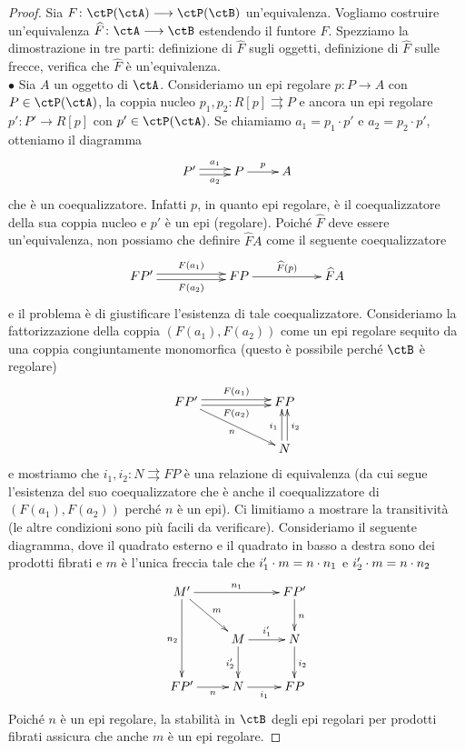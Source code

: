 \begin{proof}
 Sia \(F \colon \ctP(\ctA) \fun \ctP(\ctB)\) un'equivalenza. Vogliamo costruire un'equivalenza \(\widehat{F} \colon \ctA \fun \ctB\)
 estendendo il funtore \(F\). Spezziamo la dimostrazione in tre parti: definizione di \(\widehat{F}\) sugli oggetti, definizione di
 \(\widehat{F}\) sulle frecce, verifica che \(\widehat{F}\) è un'equivalenza. \\
 \(\bullet\) Sia \(A\) un oggetto di \(\ctA\). Consideriamo un epi regolare \(p \colon P \to A\) con \(P \in \ctP(\ctA)\), la coppia nucleo
 \(p_1,p_2 \colon R[p] \rightrightarrows P\) e ancora un epi regolare \(p' \colon P' \to R[p]\) con \(p' \in \ctP(\ctA)\). Se chiamiamo
 \(a_1 = p_1 \cdot p'\) e \(a_2 = p_2 \cdot p'\), otteniamo il diagramma
 \[\xymatrix{P' \ar@<0,5ex>[r]^-{a_1} \ar@<-0.5ex>[r]_-{a_2} & P \ar[r]^-{p} & A }\]
 che è un coequalizzatore. Infatti \(p\), in quanto epi regolare, è il coequalizzatore della sua coppia nucleo e \(p'\) è un epi
 (regolare). Poiché \(\widehat{F}\) deve essere un'equivalenza, non possiamo che definire \(\widehat{F}A\) come il seguente
 coequalizzatore
 \[\xymatrix{FP' \ar@<0,5ex>[rr]^-{F(a_1)} \ar@<-0.5ex>[rr]_-{F(a_2)} & & FP \ar[rr]^-{\widehat{F}(p)} & & \widehat{F}A }\]
 e il problema è di giustificare l'esistenza di tale coequalizzatore. Consideriamo la fattorizzazione della coppia \((F(a_1),F(a_2))\)
 come un epi regolare sequito da una coppia congiuntamente monomorfica (questo è possibile perché \(\ctB\) è regolare)
 \[\xymatrix{FP' \ar@<0.5ex>[rr]^-{F(a_1)} \ar@<-0.5ex>[rr]_-{F(a_2)} \ar[rrd]_{n} & & FP \\
  & & N \ar@<0.5ex>[u]^{i_1} \ar@<-0.5ex>[u]_{i_2} }\]
 e mostriamo che \(i_1,i_2 \colon N \rightrightarrows FP\) è una relazione di equivalenza (da cui segue l'esistenza del suo
 coequalizzatore che è anche il coequalizzatore di \((F(a_1),F(a_2))\) perché \(n\) è un epi). Ci limitiamo a mostrare la transitività
 (le altre condizioni sono più facili da verificare). Consideriamo il seguente diagramma, dove il quadrato esterno e il quadrato in
 basso a destra sono dei prodotti fibrati e \(m\) è l'unica freccia tale che \(i_1' \cdot m = n \cdot n_1\) e \(i_2' \cdot m = n \cdot n_2\)
 \[\xymatrix{M' \ar[dd]_{n_2} \ar[rr]^-{n_1} \ar[rd]^{m} & & FP' \ar[d]^{n} \\
  & M \ar[d]_{i_2'} \ar[r]^-{i_1'} & N \ar[d]^{i_2} \\
  FP' \ar[r]_-{n} & N \ar[r]_-{i_1} & FP }\]
 Poiché \(n\) è un epi regolare, la stabilità in \(\ctB\) degli epi regolari per prodotti fibrati assicura che anche \(m\) è un epi regolare.

\end{proof}
